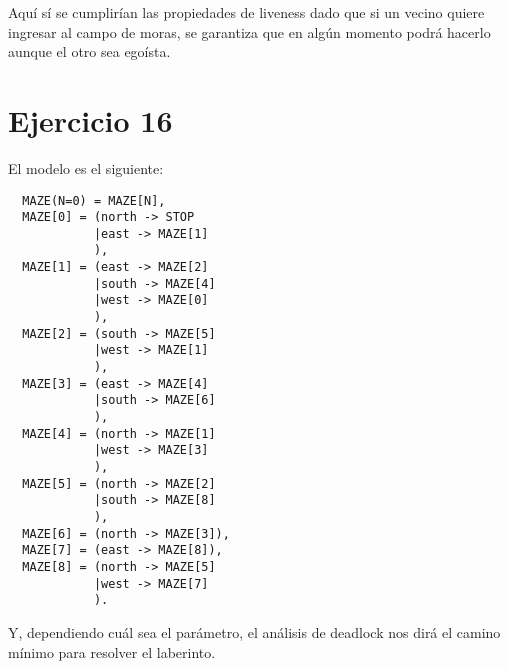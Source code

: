\documentclass{article}
\begin{document}
Aquí sí se cumplirían las propiedades de liveness dado que si un vecino quiere ingresar al campo de moras, se garantiza que en algún momento podrá hacerlo aunque el otro sea egoísta.

\section*{Ejercicio 16}
El modelo es el siguiente:
\begin{verbatim}
  MAZE(N=0) = MAZE[N],
  MAZE[0] = (north -> STOP 
            |east -> MAZE[1]
            ),
  MAZE[1] = (east -> MAZE[2]
            |south -> MAZE[4]
            |west -> MAZE[0]
            ),
  MAZE[2] = (south -> MAZE[5]
            |west -> MAZE[1]
            ),
  MAZE[3] = (east -> MAZE[4]
            |south -> MAZE[6]
            ),
  MAZE[4] = (north -> MAZE[1]
            |west -> MAZE[3]
            ),
  MAZE[5] = (north -> MAZE[2]
            |south -> MAZE[8]
            ),
  MAZE[6] = (north -> MAZE[3]),
  MAZE[7] = (east -> MAZE[8]),
  MAZE[8] = (north -> MAZE[5]
            |west -> MAZE[7]
            ).
\end{verbatim}

Y, dependiendo cuál sea el parámetro, el análisis de deadlock nos dirá el camino mínimo para resolver el laberinto.
\end{document}
